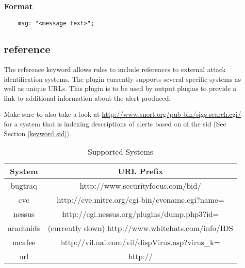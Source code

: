 \documentclass[english]{report}
\begin{document}
\subsubsection{Format}

\begin{verbatim}
    msg: "<message text>";
\end{verbatim}

\subsection{reference}

The reference keyword allows rules to include references to external attack
identification systems. The plugin currently supports several specific systems
as well as unique URLs. This plugin is to be used by output plugins to provide
a link to additional information about the alert produced.

Make sure to also take a look at
\url{http://www.snort.org/pub-bin/sigs-search.cgi/} for a system that is
indexing descriptions of alerts based on of the sid (See Section \ref{keyword
sid}).

\begin{table}[h]
\begin{center}
\caption{Supported Systems}
\label{references systems}
\begin{tabular}{|c|c|}

\hline 
System&
URL Prefix\\
\hline

\hline 
bugtraq&
http://www.securityfocus.com/bid/\\

\hline 
cve&
http://cve.mitre.org/cgi-bin/cvename.cgi?name=\\

\hline 
nessus &
http://cgi.nessus.org/plugins/dump.php3?id=\\

\hline 
arachnids&
(currently down) http://www.whitehats.com/info/IDS\\

\hline 
mcafee&
http://vil.nai.com/vil/dispVirus.asp?virus\_k=\\

\hline 
url&
http://\\

\hline
\end{tabular}
\end{center}
\end{table}
\end{document}
